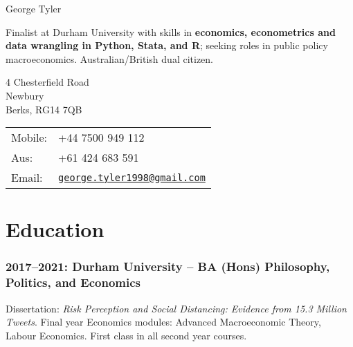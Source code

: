 \documentclass[a4]{article}
\def\name{George Tyler}
\renewenvironment{itemize}{
  \begin{list}{}{
    \setlength{\leftmargin}{1.5em}
  }
}{
  \end{list}
}
\begin{document}
{\huge \name}


\vspace{0.25in}

Finalist at Durham University with skills in \textbf{economics, econometrics and data wrangling in Python, Stata, and R}; seeking roles in public policy macroeconomics. Australian/British dual citizen. 

\vspace{0.25in}

\begin{minipage}{0.45\linewidth}
  4 Chesterfield Road \\
  Newbury \\
  Berks, RG14 7QB
\end{minipage}
\begin{minipage}{0.45\linewidth}
  \begin{tabular}{ll}
    Mobile: & +44 7500 949 112 \\
    Aus: &  +61 424 683 591 \\
    Email: & \href{mailto:george.tyler1998@gmail.com}{\tt george.tyler1998@gmail.com} \\
  \end{tabular}
\end{minipage}





\section*{Education}

\subsubsection*{2017--2021: Durham University -- BA (Hons) Philosophy, Politics, and Economics}
Dissertation: \textit{Risk Perception and Social Distancing: Evidence from 15.3 Million Tweets}. Final year Economics modules: Advanced Macroeconomic Theory, Labour Economics. First class in all second year courses.%
\end{document}
